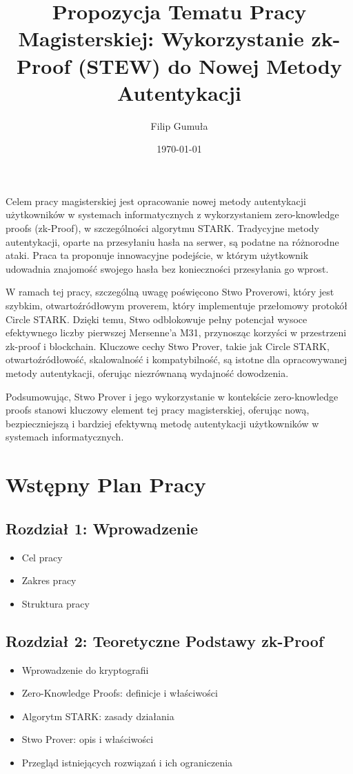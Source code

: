 \documentclass{article}
\title{Propozycja Tematu Pracy Magisterskiej: Wykorzystanie zk-Proof (STEW) do Nowej Metody Autentykacji}
\author{Filip Gumuła}
\date{\today}
\begin{document}
\maketitle

Celem pracy magisterskiej jest opracowanie nowej metody autentykacji użytkowników w systemach informatycznych z wykorzystaniem zero-knowledge proofs (zk-Proof), w szczególności algorytmu STARK. Tradycyjne metody autentykacji, oparte na przesyłaniu hasła na serwer, są podatne na różnorodne ataki. Praca ta proponuje innowacyjne podejście, w którym użytkownik udowadnia znajomość swojego hasła bez konieczności przesyłania go wprost.

W ramach tej pracy, szczególną uwagę poświęcono Stwo Proverowi, który jest szybkim, otwartoźródłowym proverem, 
który implementuje przełomowy protokół Circle STARK. Dzięki temu, Stwo odblokowuje pełny potencjał wysoce 
efektywnego liczby pierwszej Mersenne'a M31, przynosząc korzyści w przestrzeni zk-proof i blockchain. 
Kluczowe cechy Stwo Prover, takie jak Circle STARK, otwartoźródłowość, skalowalność i kompatybilność, 
są istotne dla opracowywanej metody autentykacji, oferując niezrównaną wydajność dowodzenia. 

Podsumowując, Stwo Prover i jego wykorzystanie w kontekście zero-knowledge proofs stanowi kluczowy element tej pracy magisterskiej, oferując nową, bezpieczniejszą i bardziej efektywną metodę autentykacji użytkowników w systemach informatycznych.

\section{Wstępny Plan Pracy}
\subsection{Rozdział 1: Wprowadzenie}
\begin{itemize}
    \item Cel pracy
    \item Zakres pracy
    \item Struktura pracy
\end{itemize}

\subsection{Rozdział 2: Teoretyczne Podstawy zk-Proof}
\begin{itemize}
    \item Wprowadzenie do kryptografii
    \item Zero-Knowledge Proofs: definicje i właściwości
    \item Algorytm STARK: zasady działania
    \item Stwo Prover: opis i właściwości
    \item Przegląd istniejących rozwiązań i ich ograniczenia
\end{itemize}
\end{document}
